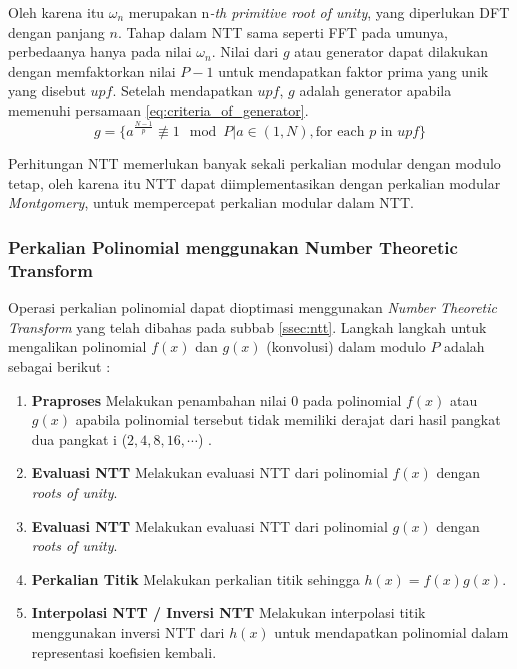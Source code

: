 Oleh karena itu $ \omega_n $ merupakan n\textit{-th primitive root of unity}, yang diperlukan DFT dengan panjang $ n $. Tahap dalam NTT sama seperti FFT pada umunya, perbedaanya hanya pada nilai $ \omega_n $. Nilai dari $ g $ atau generator dapat dilakukan dengan memfaktorkan nilai $ P - 1 $ untuk mendapatkan faktor prima yang unik yang disebut $ upf $. Setelah mendapatkan $ upf $, $ g $ adalah generator apabila memenuhi persamaan \eqref{eq:criteria_of_generator}.
\begin{equation}
	g = \{ a^{\frac{N-1}{p}} \not\equiv 1 \mod{P} | a \in (1,N) , \text{for each } p \text{ in } upf \}
	\label{eq:criteria_of_generator}
\end{equation} 

Perhitungan NTT memerlukan banyak sekali perkalian modular dengan modulo tetap, oleh karena itu NTT dapat diimplementasikan dengan perkalian modular \textit{Montgomery}, untuk mempercepat perkalian modular dalam NTT.

\subsubsection{Perkalian Polinomial menggunakan Number Theoretic Transform}
\label{ssec:langkah_perkalian_ntt}
Operasi perkalian polinomial dapat dioptimasi menggunakan \textit{Number Theoretic Transform} yang telah dibahas pada subbab \ref{ssec:ntt}. Langkah langkah untuk mengalikan polinomial $f(x)$ dan $g(x)$ (konvolusi) dalam modulo $ P $ adalah sebagai berikut :
\begin{enumerate}
	\item \textbf{Praproses} Melakukan penambahan nilai 0 pada polinomial $ f(x) $ atau $ g(x) $ apabila polinomial tersebut tidak memiliki derajat dari hasil pangkat dua pangkat i ($ 2,4,8,16, \cdots $) .
	\item \textbf{Evaluasi NTT} Melakukan evaluasi NTT dari polinomial $ f(x) $ dengan \textit{roots of unity}.
	\item \textbf{Evaluasi NTT} Melakukan evaluasi NTT dari polinomial $ g(x) $ dengan \textit{roots of unity}.
	\item \textbf{Perkalian Titik} Melakukan perkalian titik sehingga $ h(x) = f(x)g(x) $.
	\item \textbf{Interpolasi NTT / Inversi NTT} Melakukan interpolasi titik menggunakan inversi NTT dari $ h(x) $ untuk mendapatkan polinomial dalam representasi koefisien kembali.
\end{enumerate}

